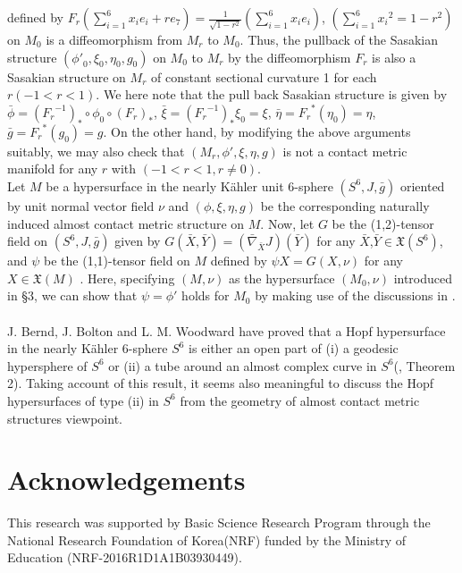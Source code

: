 \documentclass[12pt]{article}
\numberwithin{equation}{section}
\begin{document}
defined by $F_{r}(\sum_{i=1}^{6} x_{i}e_{i} + re_{7}) = \frac{1}{\sqrt{1-r^{2}}}(\sum_{i=1}^{6} x_{i}e_{i})$,
$(\sum_{i=1}^6 {x_{i}}^{2}=1-r^{2})$ on $M_{0}$ is a diffeomorphism from $M_{r}$ to $M_{0}$.
Thus, the pullback of the Sasakian structure $({\phi'}_{0}, {\xi}_{0},{\eta}_{0},{g}_{0})$ on $M_{0}$ to $M_{r}$
by the diffeomorphism $F_{r}$ is also a Sasakian structure on $M_{r}$ of constant sectional curvature 1 for each $r(-1<r<1)$.
We here note that the pull back Sasakian structure is given by $\bar{\phi}=({{F_{r}}^{-1}})_{*} \circ {\phi_{0}} \circ ({F_{r}})_{*}$,
$\bar{\xi} = ({{F_{r}}^{-1}})_{*}{\xi}_{0}=\xi$, $\bar{\eta}= {F_{r}}^{*}({\eta}_{0})=\eta$, $\bar{g}={F_{r}}^{*} (g_{0})=g$.
On the other hand, by modifying the above arguments suitably,
we may also check that $(M_{r}, \phi',\xi,\eta,g)$ is
not a contact metric manifold for any $r$ with $(-1<r<1, r\neq 0).$\\

 Let $M$ be a hypersurface in the nearly
K\"{a}hler unit 6-sphere $(S^6,J,\bar{g})$ oriented by unit normal
vector field $\nu$ and $(\phi,\xi,\eta,g)$ be the corresponding
naturally induced almost contact metric structure on $M$. Now, let
$G$ be the (1,2)-tensor field on $(S^6,J,\bar{g})$ given by
$G(\bar{X},\bar{Y}) = (\bar{\nabla}_{\bar{X}} J)(\bar{Y})$
for any $\bar{X}$,$\bar{Y}\in \mathfrak{X}(S^6)$, and $\psi$ be the
(1,1)-tensor field on $M$ defined by $\psi X = G(X,\nu)$ for any $X
\in\mathfrak{X}(M)$ \cite{DA}. Here, specifying $(M,\nu)$ as the
hypersurface $(M_{0},\nu)$ introduced in \S3, we can show that $\psi
= \phi'$ holds for $M_{0}$ by making use of the discussions in {\cite{DA, Se}}.\\\\
 J. Bernd, J. Bolton and L. M. Woodward have proved
that a Hopf hypersurface in the nearly {K\"ahler} 6-sphere $S^6$ is
either an open part of (i) a geodesic hypersphere of $S^6$ or (ii) a tube around an almost complex curve in $S^6$({\cite{BBW}},
Theorem 2). Taking account of this result, it seems also
meaningful to discuss the Hopf hypersurfaces of type (ii) in $S^6$
from the geometry of almost contact metric structures
viewpoint.

\section*{Acknowledgements}
\noindent This research was supported by Basic Science Research Program through
the National Research Foundation of Korea(NRF)
funded by the Ministry of Education (NRF-2016R1D1A1B03930449).
\end{document}
